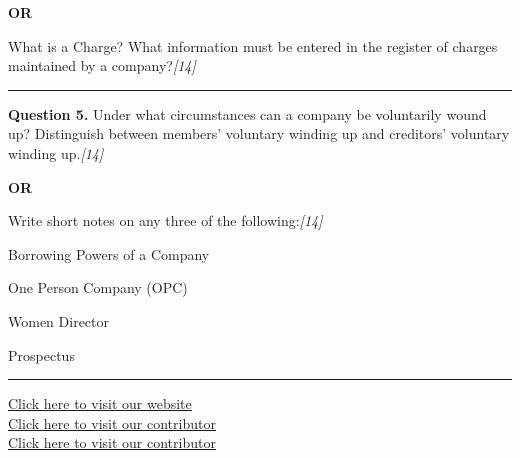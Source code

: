 \documentclass[11pt,a4paper]{article}
\newcommand{\pts}[1]{\hfill   \textit{[#1]}}
\begin{document}
\centerline{   \textbf{OR}}

What is a Charge? What information must be entered in the register of charges maintained by a company?\pts{14}

\medskip\rule{\linewidth}{0.2pt}




\noindent   \textbf{Question 5.}
Under what circumstances can a company be voluntarily wound up? Distinguish between members' voluntary winding up and creditors' voluntary winding up.\pts{14}

\centerline{   \textbf{OR}}

Write short notes on any three of the following:\pts{14}

\begin{parts}
  \item Borrowing Powers of a Company
  \item One Person Company (OPC)
  \item Women Director
  \item Prospectus
\end{parts}

\vfill
\rule{\linewidth}{0.4pt}

\begin{center}\small
\href{https://bhu-exam.vercel.app/}{Click here to visit our website}\\[4pt]
\href{https://me-aryan.vercel.app/}{Click here to visit our contributor}\\[4pt]
\href{https://quashan-me.vercel.app/}{Click here to visit our contributor}
\end{center}
\end{document}
